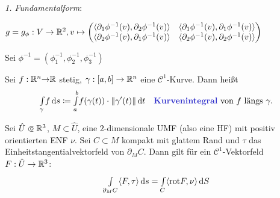 \documentclass{cheat-sheet}
\newcommand{\rot}{\mathrm{rot}} %
\theoremstyle{definition}
\newcommand{\Intdf}[2]{{\textstyle \int\limits_{#1}} #2} %
\newcommand{\scp}[2]{\langle #1 , #2 \rangle} %
\begin{document}
  \emph{1. Fundamentalform}:

  $g = g_\phi : V \to \R^2, v \mapsto \begin{pmatrix} \scp{\partial_1 \phi^{-1}(v)}{\partial_2 \phi^{-1}(v)} & \scp{\partial_1 \phi^{-1}(v)}{\partial_1 \phi^{-1}(v)} \\ \scp{\partial_2 \phi^{-1}(v)}{\partial_1 \phi^{-1}(v)} & \scp{\partial_2 \phi^{-1}(v)}{\partial_2 \phi^{-1}(v)} \end{pmatrix}$

  Sei $\phi^{-1} = (\phi_1^{-1}, \phi_2^{-1}, \phi_3^{-1})$
\fi



\iffalse
  Sei $M \subset \R^n$ eine $1$-dimensionale UMF, $\omega = \sum_{j=1}^n F_j \d x_j = F \cdot \d \vec{s}$ mit $F = (F_1, ..., F_n)^T$ eine stetige $1$-Form auf $\R^n$.

  Sei $(\phi, U)$ eine Karte von $M$, $U$ zusammmenhängend, dann $\phi(U) =: V \opn \R^1$ ebenfalls zusammenhängend, d.\,h. $V = \ointerval{a}{b}$. Dann ist
  \[ \phi^{-1} : \ointerval{a}{b} \to \R^n, \quad t \mapsto \left( \phi_1^{-1}(t), ..., \phi_n^{-1}(t) \right)^T \]
  eine glatte reguläre Kurve.
  \[ (\phi^{-1})^* \omega = \sum_{j=1}^n (F_j \circ \phi^{-1}) \d \phi_j^{-1} = \sum_{j=1}^n (F_j \circ \phi^{-1}) (\phi_j^{-1})' \d t \]
  \[ (\phi^{-1})^* (F \cdot \d \vec{s}) = \langle F \circ \phi^{-1}, (\phi^{-1})' \rangle \]
  Also:
  \[ \Intdf{U}{\omega} = \Intdf{\ointerval{a}{b}}{(\phi^{-1})^* \omega} = \Int{\ointerval{a}{b}}{}{\langle F \circ \phi^{-1} , (\phi^{-1})' \rangle}{\lambda_1} = \Int{a}{b}{\langle (F \circ \phi^{-1})(t) , (\phi^{-1})'(t) \rangle}{t} = \Int{a}{b}{\langle F(\phi^{-1}(t)) , \tau(t) \rangle \norm{(\phi^{-1})'(t)}}{t}, \]
  wobei $\tau(t) = \tfrac{(\phi^{-1})'(t)}{\norm{(\phi^{-1})'(t)}}$ ein positiv orientierter Einheitstangentialvektor
\fi

\begin{defn}
  Sei $f : \mathbb{R}^n {\to} \mathbb{R}$ stetig, $\gamma : \left[ a, b \right] \to \mathbb{R}^n$ eine $\mathcal{C}^1$-Kurve. Dann heißt
  \[
    \Int{\gamma}{}{f}{s} \coloneqq \Int{a}{b}{f(\gamma(t)) \cdot \norm{\gamma'(t)}}{t} \quad
    \text{\emph{Kurvenintegral} von $f$ längs $\gamma$.}
  \]
\end{defn}

\begin{satz}
  Sei $\hat{U} \opn \R^3$, $M \subset \hat{U}$, eine $2$-dimensionale UMF (also eine HF) mit positiv orientierten ENF $\nu$. Sei $C \subset M$ kompakt mit glattem Rand und $\tau$ das Einheitstangentialvektorfeld von $\partial_M C$. Dann gilt für ein $\mathcal{C}^1$-Vektorfeld $F : \hat{U} \to \mathbb{R}^3$:
  \[ \Int{\partial_M C}{}{\langle F, \tau \rangle}{s} = \Int{C}{}{\langle \rot F, \nu \rangle}{S} \]
\end{satz}
\end{document}
